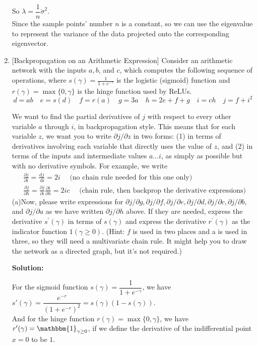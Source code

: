 \documentclass[10pt]{article}
\begin{document}
\begin{enumerate}[1.]
So $\lambda=\dfrac{1}{n}\dot{\sigma}^2$.\\
Since the sample points' number $n$ is a constant, so we can use the eigenvalue to represent the variance of the data projected onto the corresponding eigenvector.\\

\newpage
 
	\item {} [Backpropagation on an Arithmetic Expression]
Consider an arithmetic network with the inputs $a, b$, and $c$, which computes the following sequence of operations, where $s(\gamma)=\frac{1}{1+e^{-\gamma}}$ is the logistic (sigmoid) function and $r(\gamma)=\max \{0, \gamma\}$ is the hinge function used by ReLUs.
$$
d=a b \quad e=s(d) \quad f=r(a) \quad g=3 a \quad h=2 e+f+g \quad i=c h \quad j=f+i^2
$$

We want to find the partial derivatives of $j$ with respect to every other variable $a$ through $i$, in backpropagation style. This means that for each variable $z$, we want you to write $\partial j / \partial z$ in two forms: (1) in terms of derivatives involving each variable that directly uses the value of $z$, and (2) in terms of the inputs and intermediate values $a \ldots i$, as simply as possible but with no derivative symbols. For example, we write
$$
\begin{aligned}
& \frac{\partial j}{\partial i}=\frac{\mathrm{d} j}{\mathrm{~d} i}=2 i \quad \text { (no chain rule needed for this one only) } \\
& \frac{\partial j}{\partial h}=\frac{\partial j}{\partial i} \frac{\partial i}{\partial h}=2 i c \quad \text { (chain rule, then backprop the derivative expressions) }
\end{aligned}
$$
(a)Now, please write expressions for $\partial j / \partial g, \partial j / \partial f, \partial j / \partial e, \partial j / \partial d, \partial j / \partial c, \partial j / \partial b$, and $\partial j / \partial a$ as we have written $\partial j / \partial h$ above. If they are needed, express the derivative $s^{\prime}(\gamma)$ in terms of $s(\gamma)$ and express the derivative $r^{\prime}(\gamma)$ as the indicator function $1(\gamma \geq 0)$. (Hint: $f$ is used in two places and a is used in three, so they will need a multivariate chain rule. It might help you to draw the network as a directed graph, but it's not required.)

\textbf{Solution:}

For the sigmoid function $s(\gamma)=\dfrac{1}{1+e^{-\gamma}}$, we have $s'(\gamma)=\dfrac{e^{-r}}{(1+e^{-r})^2}=s(\gamma)(1-s(\gamma))$.\\
And for the hinge function $r(\gamma)=\max \{0, \gamma\}$, we have $r'(\gamma)=\mathbbm{1}_{\gamma \geq 0}$, if we define the derivative of the indifferential point $x=0$ to be $1$.\\


\end{enumerate}
\end{document}
